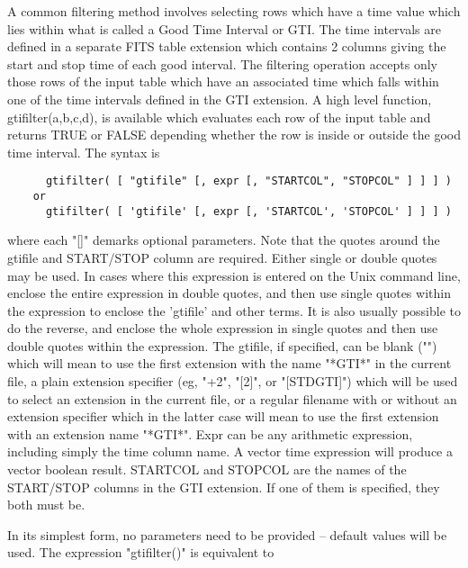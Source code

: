 \documentclass[11pt]{book}
\begin{document}
    A common filtering method involves selecting rows which have a time
    value which lies within what is called a Good Time Interval or GTI.
    The time intervals are defined in a separate FITS table extension
    which contains 2 columns giving the start and stop time of each
    good interval.  The filtering operation accepts only those rows of
    the input table which have an associated time which falls within
    one of the time intervals defined in the GTI extension. A high
    level function, gtifilter(a,b,c,d), is available which evaluates
    each row of the input table  and returns TRUE  or FALSE depending
    whether the row is inside or outside the  good time interval.  The
    syntax is

\begin{verbatim}
      gtifilter( [ "gtifile" [, expr [, "STARTCOL", "STOPCOL" ] ] ] )
    or
      gtifilter( [ 'gtifile' [, expr [, 'STARTCOL', 'STOPCOL' ] ] ] )
\end{verbatim}
    where  each "[]" demarks optional parameters.  Note that  the quotes
    around the gtifile and START/STOP column are required.  Either single
    or double quotes may be used.  In cases where this expression is
    entered on the Unix command line, enclose the entire expression in
    double quotes, and then use single quotes within the expression to
    enclose the 'gtifile' and other terms.  It is also usually possible
    to do the reverse, and enclose the whole expression in single quotes
    and then use double quotes within the expression.  The gtifile,
    if specified,  can be blank  ("") which will  mean to use  the first
    extension  with   the name "*GTI*"  in   the current  file,  a plain
    extension  specifier (eg, "+2",  "[2]", or "[STDGTI]") which will be
    used  to  select  an extension  in  the current  file, or  a regular
    filename with or without an extension  specifier which in the latter
    case  will mean to  use the first  extension  with an extension name
    "*GTI*".  Expr can be   any arithmetic expression, including  simply
    the time  column  name.  A  vector  time expression  will  produce a
    vector boolean  result.  STARTCOL and  STOPCOL are the  names of the
    START/STOP   columns in the    GTI extension.  If   one  of them  is
    specified, they both  must be.

    In  its  simplest form, no parameters need to be provided -- default
    values will be used.  The expression "gtifilter()" is equivalent to
\end{document}
